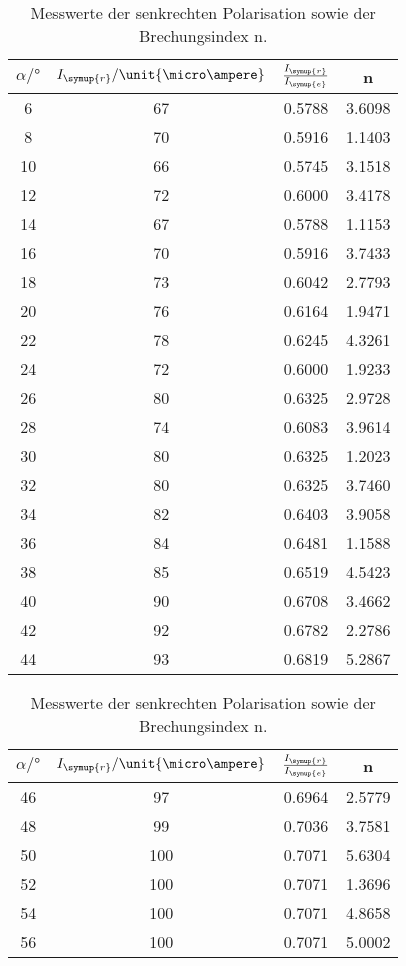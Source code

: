 \begin{table}
    \centering
    \caption{Messwerte der senkrechten Polarisation sowie der Brechungsindex n.}
    \begin{tabular}{c c c c}
        \toprule
        $\alpha \mathrm{/} \unit{\degree}$  & $I_{\symup{r}}\mathrm{/}\unit{\micro\ampere}$ & $\frac{I_{\symup{r}}}{I_{\symup{e}}}$ & n\\
        \midrule
        6&67&0.5788&3.6098 \\
        8&70&0.5916&1.1403 \\
       10&66&0.5745&3.1518 \\
       12&72&0.6000&3.4178 \\
       14&67&0.5788&1.1153 \\
       16&70&0.5916&3.7433 \\
       18&73&0.6042&2.7793 \\
       20&76&0.6164&1.9471 \\
       22&78&0.6245&4.3261 \\
       24&72&0.6000&1.9233 \\
       26&80&0.6325&2.9728 \\
       28&74&0.6083&3.9614 \\
       30&80&0.6325&1.2023 \\
       32&80&0.6325&3.7460 \\
       34&82&0.6403&3.9058 \\
       36&84&0.6481&1.1588 \\
       38&85&0.6519&4.5423 \\
       40&90&0.6708&3.4662 \\
       42&92&0.6782&2.2786 \\
       44&93&0.6819&5.2867 \\
       \bottomrule
    \end{tabular}
    \quad
    \begin{tabular}{c c c c}
        \toprule
        $\alpha \mathrm{/} \unit{\degree}$  & $I_{\symup{r}}\mathrm{/}\unit{\micro\ampere}$ & $\frac{I_{\symup{r}}}{I_{\symup{e}}}$ & n\\
        \midrule
       46&97&0.6964&2.5779 \\
       48&99&0.7036&3.7581 \\
      50&100&0.7071&5.6304 \\
      52&100&0.7071&1.3696 \\
      54&100&0.7071&4.8658 \\
      56&100&0.7071&5.0002 \\

\end{tabular}
\end{table}

